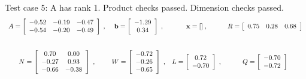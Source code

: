 {Test case 5: A has rank 1. Product checks passed. Dimension checks passed.
\[
\begin{array}{*{4}{c}}
A = \left[\begin{array}{*{3}c}
	-0.52 & -0.19 & -0.47\\
	-0.54 & -0.20 & -0.49
\end{array}\right]
\;, & 
\mathbf{b} = \left[\begin{array}{*{1}c}
	-1.29\\
	0.34
\end{array}\right]
\;, & 
\mathbf{x} = []\;, & 
R = \left[\begin{array}{*{3}c}
	0.75 & 0.28 & 0.68
\end{array}\right]
\\
\\\mbox{}\\
N = \left[\begin{array}{*{2}c}
	0.70 & 0.00\\
	-0.27 & 0.93\\
	-0.66 & -0.38
\end{array}\right]
\;, & 
W = \left[\begin{array}{*{1}c}
	-0.72\\
	-0.26\\
	-0.65
\end{array}\right]
\;, & 
L = \left[\begin{array}{*{1}c}
	0.72\\
	-0.70
\end{array}\right]
\;, & 
Q = \left[\begin{array}{*{1}c}
	-0.70\\
	-0.72
\end{array}\right]
\\
\end{array}
\]
\hrulefill

}
